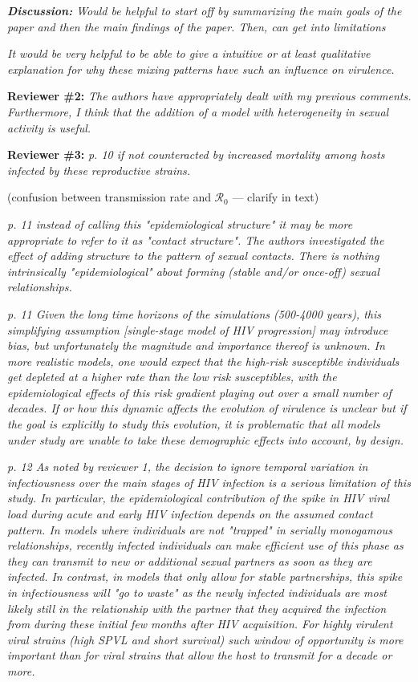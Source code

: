 \documentclass[10pt]{letter}
\newcommand{\revcomment}[1]{\emph{#1}}
\newcommand{\response}[1]{#1}
\begin{document}
\begin{letter}{
}
\revcomment{
\textbf{Discussion:}
Would be helpful to start off by summarizing the main goals of the paper and then the main findings of the paper. Then, can get into limitations
}

\revcomment{
It would be very helpful to be able to give a intuitive or at least qualitative explanation for why these mixing patterns have such an influence on virulence.
}

\textbf{Reviewer \#2:}
\revcomment{
 The authors have appropriately dealt with my previous comments. Furthermore, I think that the addition of a model with heterogeneity in sexual activity is useful.
}

\textbf{Reviewer \#3:}
\revcomment{
p. 10 if not counteracted by increased mortality among hosts infected by these reproductive strains.
}

\response{(confusion between transmission rate and  ${\mathcal R}_0$ ---
  clarify in text)}

\revcomment{
p. 11 instead of calling this "epidemiological structure" it may be more appropriate to refer to it as "contact structure". The authors investigated the effect of adding structure to the pattern of sexual contacts. There is nothing intrinsically "epidemiological" about forming (stable and/or once-off) sexual relationships.
}

\revcomment{
p. 11 Given the long time horizons of the simulations (500-4000
years), this simplifying assumption [single-stage model of HIV
progression] may introduce bias, but unfortunately the magnitude and importance thereof is unknown. In more realistic models, one would expect that the high-risk susceptible individuals get depleted at a higher rate than the low risk susceptibles, with the epidemiological effects of this risk gradient playing out over a small number of decades. If or how this dynamic affects the evolution of virulence is unclear but if the goal is explicitly to study this evolution, it is problematic that all models under study are unable to take these demographic effects into account, by design.
}

\revcomment{
p. 12 As noted by reviewer 1, the decision to ignore temporal variation in
infectiousness over the main stages of HIV infection is a serious
limitation of this study. In particular, the epidemiological
contribution of the spike in HIV viral load during acute and early HIV
infection depends on the assumed contact pattern. In models where
individuals are not "trapped" in serially monogamous relationships,
recently infected individuals can make efficient use of this phase as
they can transmit to new or additional sexual partners as soon as they
are infected. In contrast, in models that only allow for stable
partnerships, this spike in infectiousness will "go to waste" as the
newly infected individuals are most likely still in the relationship
with the partner that they acquired the infection from during these
initial few months after HIV acquisition. For highly virulent viral
strains (high SPVL and short survival) such window of opportunity is
more important than for viral strains that allow the host to transmit
for a decade or more.
}


\end{letter}
\end{document}
